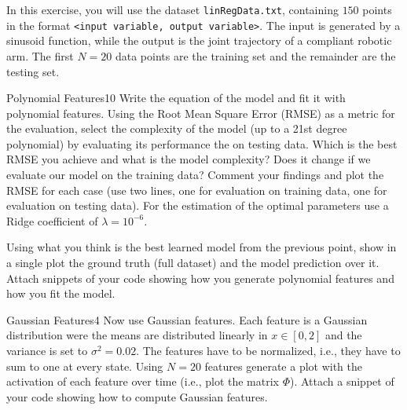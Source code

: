 \newif\ifvimbug
\vimbugfalse

\ifvimbug

\fi


In this exercise, you will use the dataset \texttt{linRegData.txt}, containing $150$ points in the format \texttt{<input variable, output variable>}. The input is generated by a sinusoid function, while the output is the joint trajectory of a compliant robotic arm. 
The first $N=20$ data points are the training set and the remainder are the testing set.

\begin{questions}


\begin{question}{Polynomial Features}{10}
Write the equation of the model and fit it with polynomial features. Using the Root Mean Square Error (RMSE) as a metric for the evaluation, select the complexity of the model (up to a 21st degree polynomial) by evaluating its performance the on testing data. Which is the best RMSE you achieve and what is the model complexity? Does it change if we evaluate our model on the training data? Comment your findings and plot the RMSE for each case (use two lines, one for evaluation on training data, one for evaluation on testing data).
For the estimation of the optimal parameters use a Ridge coefficient of $\lambda=10^{-6}$.

Using what you think is the best learned model from the previous point, show in a single plot the ground truth (full dataset) and the model prediction over it.
Attach snippets of your code showing how you generate polynomial features and how you fit the model.


\begin{answer}\end{answer}

\end{question}


\begin{question}{Gaussian Features}{4}
Now use Gaussian features. Each feature is a Gaussian distribution were the means are distributed linearly in $x \in[0,2]$ and the variance is set to $\sigma^2=0.02$. The features have to be normalized, i.e., they have to sum to one at every state. Using $N=20$ features generate a plot with the activation of each feature over time (i.e., plot the matrix $\Phi$). Attach a snippet of your code showing how to compute Gaussian features.


\end{question}
\end{questions}
